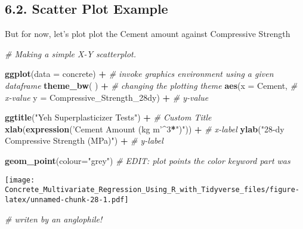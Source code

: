 \documentclass[]{article}
\newenvironment{Shaded}{\begin{snugshade}}{\end{snugshade}}
\newcommand{\CommentTok}[1]{\textcolor[rgb]{0.56,0.35,0.01}{\textit{#1}}}
\newcommand{\DataTypeTok}[1]{\textcolor[rgb]{0.13,0.29,0.53}{#1}}
\newcommand{\DecValTok}[1]{\textcolor[rgb]{0.00,0.00,0.81}{#1}}
\newcommand{\KeywordTok}[1]{\textcolor[rgb]{0.13,0.29,0.53}{\textbf{#1}}}
\newcommand{\NormalTok}[1]{#1}
\newcommand{\OperatorTok}[1]{\textcolor[rgb]{0.81,0.36,0.00}{\textbf{#1}}}
\newcommand{\StringTok}[1]{\textcolor[rgb]{0.31,0.60,0.02}{#1}}
\begin{document}
\hypertarget{scatter-plot-example}{%
\subsection{6.2. Scatter Plot Example}\label{scatter-plot-example}}

But for now, let's plot plot the Cement amount against Compressive
Strength

\begin{Shaded}
\begin{Highlighting}[]
\CommentTok{# Making a simple X-Y scatterplot.}

\KeywordTok{ggplot}\NormalTok{(}\DataTypeTok{data =}\NormalTok{ concrete) }\OperatorTok{+}\StringTok{                }\CommentTok{# invoke graphics environment using a given dataframe}
\StringTok{  }
\StringTok{  }\KeywordTok{theme_bw}\NormalTok{( ) }\OperatorTok{+}\StringTok{                           }\CommentTok{# changing the plotting theme}
\StringTok{  }
\StringTok{  }\KeywordTok{aes}\NormalTok{(}\DataTypeTok{x      =}\NormalTok{ Cement,                       }\CommentTok{# x-value}
      \DataTypeTok{y      =}\NormalTok{ Compressive_Strength_28dy) }\OperatorTok{+}\StringTok{  }\CommentTok{# y-value}

\StringTok{  }\KeywordTok{ggtitle}\NormalTok{(}\StringTok{"Yeh Superplasticizer Tests"}\NormalTok{) }\OperatorTok{+}\StringTok{    }\CommentTok{# Custom Title}
\StringTok{  }
\StringTok{  }\KeywordTok{xlab}\NormalTok{(}\KeywordTok{expression}\NormalTok{(}\StringTok{'Cement Amount (kg m'}\OperatorTok{^}\DecValTok{3}\OperatorTok{*}\StringTok{")"}\NormalTok{)) }\OperatorTok{+}\StringTok{   }\CommentTok{# x-label}
\StringTok{  }\KeywordTok{ylab}\NormalTok{(}\StringTok{"28-dy Compressive Strength (MPa)"}\NormalTok{)      }\OperatorTok{+}\StringTok{   }\CommentTok{# y-label}

\StringTok{  }\KeywordTok{geom_point}\NormalTok{(}\DataTypeTok{colour=}\StringTok{"grey"}\NormalTok{)   }\CommentTok{# EDIT: plot points the color keyword part was}
\end{Highlighting}
\end{Shaded}

\texttt{[image: Concrete\_Multivariate\_Regression\_Using\_R\_with\_Tidyverse\_files/figure-latex/unnamed-chunk-28-1.pdf]}

\begin{Shaded}
\begin{Highlighting}[]
                              \CommentTok{#       writen by an anglophile!}
\end{Highlighting}
\end{Shaded}
\end{document}
